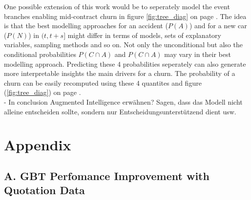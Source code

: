 \documentclass[12pt,titlepage]{article}
\begin{document}
\vspace{15mm}
One possible extension of this work would be to seperately model the event branches enabling mid-contract churn in figure \ref{fig:tree_diag} on page \pageref{fig:tree_diag}. The idea is that the best modelling approaches for an accident ($P(A)$) and for a new car ($P(N)$) in $(t, t+s]$ might differ in terms of models, sets of explanatory variables, sampling methods and so on. Not only the unconditional but also the conditional probabilities $P(C\cap A)$ and $P(C\cap A)$ may vary in their best modelling approach. Predicting these 4 probabilities seperately can also generate more interpretable insights the main drivers for a churn. The probability of a churn can be easily recomputed using these 4 quantites and figure (\ref{fig:tree_diag}) on page \pageref{fig:tree_diag}. \\

- In conclusion Augmented Intelligence erwähnen? Sagen, dass das Modell nicht alleine entscheiden sollte, sondern nur Entscheidungsunterstützend dient usw.
\newpage

\thispagestyle{empty}

\printbibliography

\vspace*{6mm}

\newpage

\thispagestyle{empty}

\section*{Appendix} \par

\subsection*{A. GBT Perfomance Improvement with Quotation Data} \par
\end{document}
